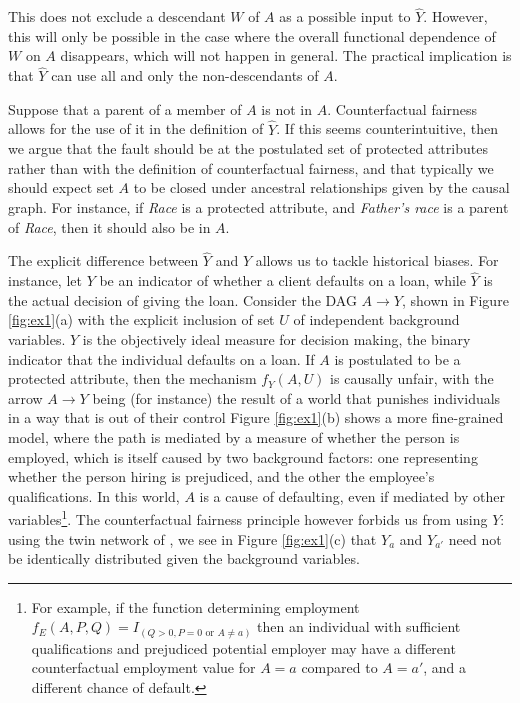 This does not exclude a descendant $W$ of $A$ as a possible input to
$\hat Y$. However, this will only be possible in the case where the
overall functional dependence of $W$ on $A$ disappears, which will not
happen in general. The practical implication is that $\hat Y$ can use
all and only the non-descendants of $A$.

 Suppose that
a parent of a member of $A$ is not in $A$.  Counterfactual fairness
allows for the use of it in the definition of $\hat Y$. If this seems
counterintuitive, then we argue that the fault should be at the
postulated set of protected attributes rather than with the definition
of counterfactual fairness, and that typically we should expect set
$A$ to be closed under ancestral relationships given by the causal
graph. For instance, if {\it Race} is a protected attribute, and {\it
  Father's race} is a parent of {\it Race}, then it should also be in
$A$.

 The explicit difference
between $\hat Y$ and $Y$ allows us to tackle historical biases. For
instance, let $Y$ be an indicator of whether a client defaults on a
loan, while $\hat Y$ is the actual decision of giving the
loan. Consider the DAG $A \rightarrow Y$, shown in Figure
\ref{fig:ex1}(a) with the explicit inclusion of set $U$ of independent
background variables. $Y$ is the objectively ideal measure for
decision making, the binary indicator that the individual defaults on
a loan. If $A$ is postulated to be a protected attribute, then the
mechanism $f_Y(A, U)$ is causally unfair, with the arrow $A
\rightarrow Y$ being (for instance) the result of a world that
punishes individuals in a way that is out of their control Figure
\ref{fig:ex1}(b) shows a more fine-grained model, where the path is
mediated by a measure of whether the person is employed, which is
itself caused by two background factors: one representing whether the
person hiring is prejudiced, and the other the employee's
qualifications. In this world, $A$ is a cause of defaulting, even if
mediated by other variables\footnote{For example, if the function
  determining employment $f_E(A,P,Q) = I_{(Q > 0, P = 0 \text{ or } A
    \neq a)}$ then an individual with sufficient qualifications and
  prejudiced potential employer may have a different counterfactual
  employment value for $A = a$ compared to $A = a'$, and a different
  chance of default. }. The counterfactual fairness principle however
forbids us from using $Y$: using the twin network of \citet{pearl:00},
we see in Figure \ref{fig:ex1}(c) that $Y_a$ and $Y_{a'}$ need not be
identically distributed given the background variables.

